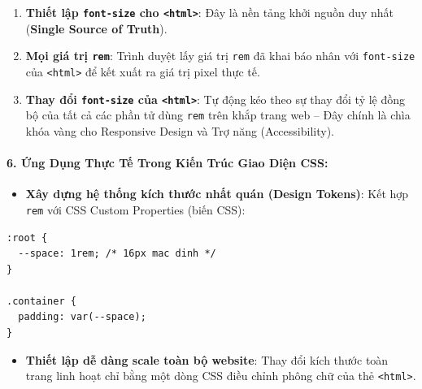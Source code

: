 \documentclass[11pt,oneside]{book}
\newcommand{\codeinline}[1]{\textcolor{accentOrange}{\texttt{#1}}}
\newcommand{\term}[1]{\textbf{\textcolor{primaryBlue}{#1}}}
\begin{document}
\begin{conceptBox}
\begin{enumerate}[leftmargin=1.5em, itemsep=3pt, parsep=0pt]
    \item \textbf{Thiết lập \codeinline{font-size} cho \codeinline{<html>}}: Đây là nền tảng khởi nguồn duy nhất (\term{Single Source of Truth}).
    \item \textbf{Mọi giá trị \codeinline{rem}}: Trình duyệt lấy giá trị \codeinline{rem} đã khai báo nhân với \codeinline{font-size} của \codeinline{<html>} để kết xuất ra giá trị pixel thực tế.
    \item \textbf{Thay đổi \codeinline{font-size} của \codeinline{<html>}}: Tự động kéo theo sự thay đổi tỷ lệ đồng bộ của tất cả các phần tử dùng \codeinline{rem} trên khắp trang web -- Đây chính là chìa khóa vàng cho Responsive Design và Trợ năng (Accessibility).
\end{enumerate}
\end{conceptBox}

\paragraph{6. Ứng Dụng Thực Tế Trong Kiến Trúc Giao Diện CSS:}
\begin{itemize}[leftmargin=1.5em, itemsep=2pt, parsep=0pt]
    \item \textbf{Xây dựng hệ thống kích thước nhất quán (\term{Design Tokens})}: Kết hợp \codeinline{rem} với CSS Custom Properties (biến CSS):
\end{itemize}

\begin{codeWindow}
\begin{lstlisting}[language=CSS3]
:root {
  --space: 1rem; /* 16px mac dinh */
}

.container {
  padding: var(--space);
}
\end{lstlisting}
\end{codeWindow}

\begin{itemize}[leftmargin=1.5em, itemsep=2pt, parsep=0pt]
    \item \textbf{Thiết lập dễ dàng scale toàn bộ website}: Thay đổi kích thước toàn trang linh hoạt chỉ bằng một dòng CSS điều chỉnh phông chữ của thẻ \codeinline{<html>}.
\end{itemize}

\end{document}
